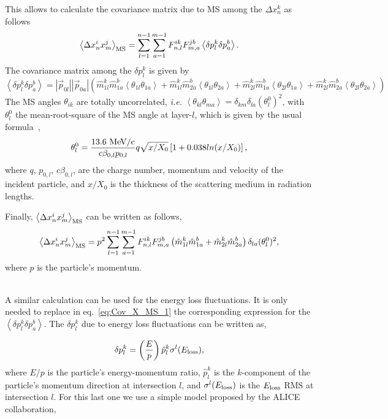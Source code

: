 \noindent
This allows to calculate the covariance matrix due to MS among the $\Delta x^{k}_{n}$ as follows
\begin{equation}
  \label{eq:Cov_X_MS_1}
  \left<  \Delta x^i_n x^j_m \right >_{\rm MS} = \sum^{n-1}_{l=1}\sum^{m-1}_{a=1} F^{ik}_{n,l} F^{jb}_{m,a} \left< \delta p^{k}_{l} \delta p^{b}_{a} \right>.
\end{equation}
\noindent
The covariance matrix among the $\delta p^k_l$ is given by
\begin{equation}
  \left< \delta p^{k}_{l} \delta p^{b}_{a} \right> = |\vec{p}_{0l}||\vec{p}_{0a}| (\hat{m}^k_{1l}\hat{m}^b_{1a} \left< \theta_{1l}\theta_{1a} \right> + \hat{m}^k_{1l}\hat{m}^b_{2a} \left< \theta_{1l}\theta_{2a} \right> + \hat{m}^k_{2l}\hat{m}^b_{1a} \left< \theta_{2l}\theta_{1a} \right> + \hat{m}^k_{2l}\hat{m}^b_{2a} \left< \theta_{2l}\theta_{2a} \right> )
\end{equation}
\noindent
The MS angles $\theta_{ik}$ are totally uncorrelated, {\it i.e.} $\left< \theta_{kl}\theta_{ma} \right> = \delta_{km}\delta_{la}(\theta^0_{l})^2$, with $\theta^0_{l}$ the mean-root-square 
of the MS angle at layer-$l$, which is given by the usual formula~\cite{bib:MS_angle},
\begin{equation}
  \theta^{0}_{l} = \frac{13.6~{\rm MeV/c}}{c\beta_{0,l}p_{0,l}} q \sqrt{x/X_0} \left[ 1 + 0.038 ln(x/X_0) \right],
\end{equation}
\noindent
where $q$, $p_{0,l}$, $c\beta_{0,l}$, are the charge number, momentum and velocity of the incident particle, and $x/X_0$ is the thickness of the scattering medium in radiation lengths.

Finally, $\left<  \Delta x^i_n x^j_m \right >_{\rm MS}$ can be written as follows,
\begin{equation}
  \left<  \Delta x^i_n x^j_m \right >_{\rm MS} = p^2 \sum^{n-1}_{l=1}\sum^{m-1}_{a=1} F^{ik}_{n,l} F^{jb}_{m,a} \left(\hat{m}^k_{1l}\hat{m}^b_{1a} + \hat{m}^k_{2l}\hat{m}^b_{2a}\right) \delta_{la} (\theta^0_l)^2,
\end{equation}
\noindent
where $p$ is the particle's momentum.


~\\
\noindent
A similar calculation can be used for the energy loss fluctuations. It is only needed to replace in eq.~\ref{eq:Cov_X_MS_1} the corresponding expression for the $\left< \delta p^{k}_{l} \delta p^{b}_{a} \right>$.
The $\delta p^{k}_{l}$ due to energy loss fluctuations can be written as,

\begin{equation}
  \delta p^{k}_{l} = \left(\frac{E}{p}\right) \hat{p}^{k}_{l} \sigma^{l}(E_{\rm loss}),
\end{equation}
\noindent
where $E/p$ is the particle's energy-momentum ratio, $\hat{p}^{k}_{l}$ is the $k$-component of the particle's momentum direction at intersection $l$, and 
$\sigma^{l}(E_{\rm loss})$ is the $E_{\rm loss}$ RMS at intersection $l$. For this last one we use a simple model proposed by the ALICE collaboration, 

